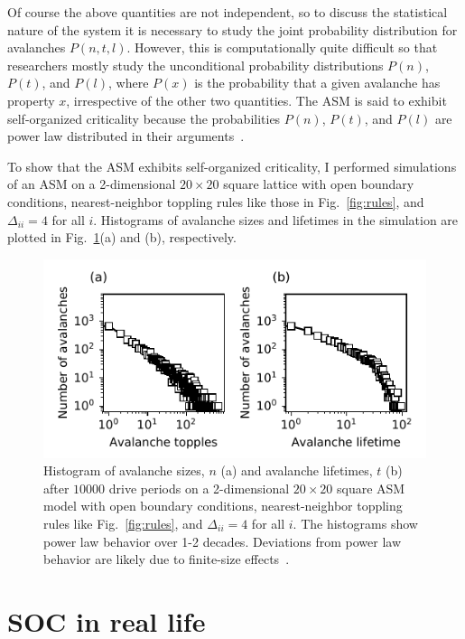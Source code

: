 \documentclass[aps,prb,reprint,superscriptaddress]{revtex4-2}
\begin{document}
Of course the above quantities are not independent, so to discuss the statistical nature of the system it is necessary to study the joint probability distribution for avalanches $P(n, t, l)$. However, this is computationally quite difficult so that researchers mostly study the unconditional probability distributions $P(n)$, $P(t)$, and $P(l)$, where $P(x)$ is the probability that a given avalanche has property $x$, irrespective of the other two quantities. The ASM is said to exhibit self-organized criticality because the probabilities $P(n)$, $P(t)$, and $P(l)$ are power law distributed in their arguments~\cite{jensen}.

To show that the ASM exhibits self-organized criticality, I performed simulations of an ASM on a 2-dimensional $20 \times 20$ square lattice with open boundary conditions, nearest-neighbor toppling rules like those in Fig.~\ref{fig:rules}, and $\Delta_{ii} = 4$ for all $i$. Histograms of avalanche sizes and lifetimes in the simulation are plotted in Fig.~\ref{fig:avalanches}(a) and (b), respectively.

\begin{figure}
\includegraphics{avalanches}
\caption{\label{fig:avalanches}Histogram of avalanche sizes, $n$ (a) and avalanche lifetimes, $t$ (b) after $10000$ drive periods on a 2-dimensional $20 \times 20$ square ASM model with open boundary conditions, nearest-neighbor toppling rules like Fig.~\ref{fig:rules}, and $\Delta_{ii} = 4$ for all $i$. The histograms show power law behavior over 1-2 decades. Deviations from power law behavior are likely due to finite-size effects~\cite{jensen}.}
\end{figure}

\section{SOC in real life}
\end{document}

